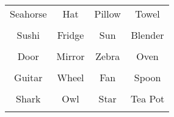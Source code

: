 \documentclass[12pt,a4paper]{article}
\begin{document}
\thispagestyle{empty}
\begin{table}[]
\centering
\Huge
\begin{tabular}{cccc}
 Seahorse& Hat& Pillow& Towel\\  & & & \\
 Sushi& Fridge& Sun& Blender\\  & & & \\
 Door& Mirror& Zebra& Oven\\  & & & \\
 Guitar& Wheel& Fan& Spoon\\  & & & \\
 Shark& Owl& Star& Tea Pot\\  & & & \\
\end{tabular}
\end{table}
\end{document}
